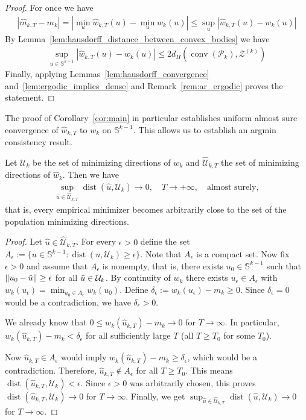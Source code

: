 \begin{proof}
    For once we have
    \begin{align*}
        |\hat{m}_{k,T}-m_k|=|\min_u\hat{w}_{k,T}(u)-\min_uw_k(u)|\le\sup_u|\hat{w}_{k,T}(u)-w_k(u)|
    \end{align*}
    By Lemma~\ref{lem:hausdorff_distance_between_convex_bodies} we have
    \begin{align*}
        \sup_{u\in\mathbb{S}^{k-1}}|\hat{w}_{k,T}(u)-w_k(u)|\le2d_H(\operatorname{conv}(\mathcal{P}_k),\mathcal{Z}^{(k)})
    \end{align*}
    Finally, applying Lemmas~\ref{lem:hausdorff_convergence} and~\ref{lem:ergodic_implies_dense} and Remark~\ref{rem:ar_ergodic} proves the statement.
\end{proof}

The proof of Corollary~\ref{cor:main} in particular establishes uniform almost sure convergence of $\hat{w}_{k,T}$ to $w_k$ on $\mathbb{S}^{k-1}$. This allows us to establish an argmin consistency result.

\begin{Cor}
    Let $\mathcal{U}_k$ be the set of minimizing directions of $w_k$ and $\hat{\mathcal{U}}_{k,T}$ the set of minimizing directions of $\hat{w}_k$. Then we have
    \begin{align*}
        \sup_{\hat{u}\in\hat{\mathcal{U}}_{k,T}}\operatorname{dist}(\hat{u},\mathcal{U}_k)\to0,\quad T\to+\infty,\quad\text{almost surely},
    \end{align*}
    that is, every empirical minimizer becomes arbitrarily close to the set of the population minimizing directions.
\end{Cor}

\begin{proof}
    Let $\hat{u}\in\hat{\mathcal{U}}_{k,T}$. For every $\epsilon>0$ define the set $A_{\epsilon}:=\{u\in\mathbb{S}^{k-1}:\operatorname{dist}(u,\mathcal{U}_k)\ge\epsilon\}$. Note that $A_{\epsilon}$ is a compact set. Now fix $\epsilon>0$ and assume that $A_{\epsilon}$ is nonempty, that is, there exists $u_0\in\mathbb{S}^{k-1}$ such that $\|u_0-\Tilde{u}\|\ge\epsilon$ for all $\Tilde{u}\in\mathcal{U}_k$. By continuity of $w_k$ there exists $u_{\epsilon}\in A_{\epsilon}$ with $w_k(u_{\epsilon})=\min_{u_0\in A_{\epsilon}}w_k(u_0)$. Define $\delta_{\epsilon}:=w_k(u_{\epsilon})-m_k\ge0$. Since $\delta_{\epsilon}=0$ would be a contradiction, we have $\delta_{\epsilon}>0$.

    We already know that $0\le w_k(\hat{u}_{k,T})-m_k\to0$ for $T\to\infty$. In particular, $w_k(\hat{u}_{k,T})-m_k<\delta_{\epsilon}$ for all sufficiently large $T$ (all $T\ge T_0$ for some $T_0$).

    Now $\hat{u}_{k,T}\in A_{\epsilon}$ would imply $w_k(\hat{u}_{k,T})-m_k\ge\delta_{\epsilon}$, which would be a contradiction. Therefore, $\hat{u}_{k,T}\notin A_{\epsilon}$ for all $T\ge T_0$. This means $\operatorname{dist}(\hat{u}_{k,T},\mathcal{U}_k)<\epsilon$. Since $\epsilon>0$ was arbitrarily chosen, this proves $\operatorname{dist}(\hat{u}_{k,T},\mathcal{U}_k)\to0$ for $T\to\infty$. Finally, we get $\sup_{\hat{u}\in\hat{\mathcal{U}}_{k,T}}\operatorname{dist}(\hat{u},\mathcal{U}_k)\to0$ for $T\to\infty$.
\end{proof}

